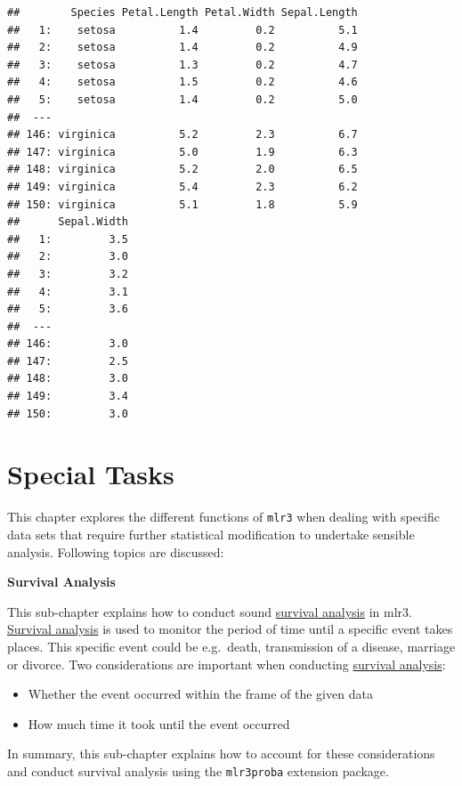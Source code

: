 \documentclass[]{article}
\providecommand{\tightlist}{%
  \setlength{\itemsep}{0pt}\setlength{\parskip}{0pt}}
\begin{document}
\begin{verbatim}
##        Species Petal.Length Petal.Width Sepal.Length
##   1:    setosa          1.4         0.2          5.1
##   2:    setosa          1.4         0.2          4.9
##   3:    setosa          1.3         0.2          4.7
##   4:    setosa          1.5         0.2          4.6
##   5:    setosa          1.4         0.2          5.0
##  ---                                                
## 146: virginica          5.2         2.3          6.7
## 147: virginica          5.0         1.9          6.3
## 148: virginica          5.2         2.0          6.5
## 149: virginica          5.4         2.3          6.2
## 150: virginica          5.1         1.8          5.9
##      Sepal.Width
##   1:         3.5
##   2:         3.0
##   3:         3.2
##   4:         3.1
##   5:         3.6
##  ---            
## 146:         3.0
## 147:         2.5
## 148:         3.0
## 149:         3.4
## 150:         3.0
\end{verbatim}

\hypertarget{special-tasks}{%
\section{Special Tasks}\label{special-tasks}}

This chapter explores the different functions of \texttt{mlr3} when dealing with specific data sets that require further statistical modification to undertake sensible analysis.
Following topics are discussed:

\textbf{Survival Analysis}

This sub-chapter explains how to conduct sound \protect\hyperlink{survival}{survival analysis} in mlr3.
\protect\hyperlink{survival}{Survival analysis} is used to monitor the period of time until a specific event takes places.
This specific event could be e.g.~death, transmission of a disease, marriage or divorce.
Two considerations are important when conducting \protect\hyperlink{survival}{survival analysis}:

\begin{itemize}
\tightlist
\item
  Whether the event occurred within the frame of the given data
\item
  How much time it took until the event occurred
\end{itemize}

In summary, this sub-chapter explains how to account for these considerations and conduct survival analysis using the \texttt{mlr3proba} extension package.
\end{document}
